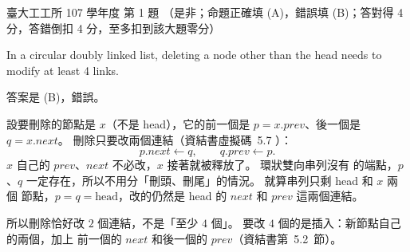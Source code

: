 \begin{pastexam}[label={px:ntu-107-ie-ds-01}]{臺大工工所 107 學年度 第 1 題}
（是非；命題正確填 (A)，錯誤填 (B)；答對得 4 分，答錯倒扣 4 分，至多扣到該大題零分）

In a circular doubly linked list, deleting a node other than the head needs to modify at least 4 links.
\end{pastexam}

\begin{pastsoln}
答案是 (B)，錯誤。

設要刪除的節點是 $x$（不是 head），它的前一個是 $p = x.\mathit{prev}$、後一個是
$q = x.\mathit{next}$。 刪除只要改兩個連結（資結書虛擬碼~5.7 ）：
\[
p.\mathit{next} \gets q, \qquad q.\mathit{prev} \gets p.
\]
$x$ 自己的 $\mathit{prev}$、$\mathit{next}$ 不必改，$x$ 接著就被釋放了。 環狀雙向串列沒有 \NIL
的端點，$p$、$q$ 一定存在，所以不用分「刪頭、刪尾」的情況。 就算串列只剩 head 和 $x$ 兩個
節點，$p = q = \text{head}$，改的仍然是 head 的 $\mathit{next}$ 和 $\mathit{prev}$ 這兩個連結。

所以刪除恰好改 $2$ 個連結，不是「至少 $4$ 個」。 要改 $4$ 個的是插入：新節點自己的兩個，加上
前一個的 $\mathit{next}$ 和後一個的 $\mathit{prev}$（資結書第~5.2~節）。
\end{pastsoln}
